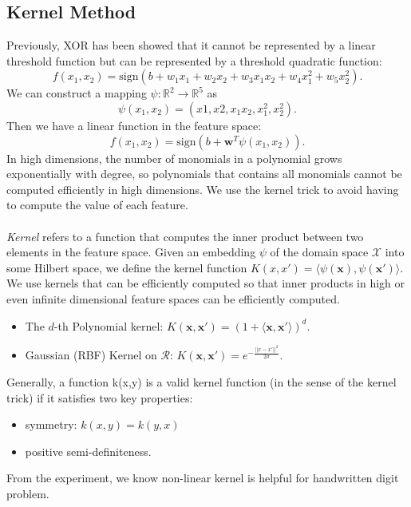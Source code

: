 \documentclass{article}
\begin{document}
   \subsection{Kernel Method}
   Previously, XOR has been showed that it cannot be represented by a linear threshold function but can be represented by a threshold quadratic function:
   \begin{equation}
   f(x_1, x_2) = \text{sign} (b+w_1x_1+w_2x_2+w_3x_1x_2+w_4x_1^2+w_5x_2^2).
   \end{equation}
   We can construct a mapping $\psi : \mathbb{R}^2 \rightarrow \mathbb{R}^5$ as
   \begin{equation}
   \psi (x_1, x_2) = (x1, x2, x_1x_2, x_1^2, x_2^2).
   \end{equation}
   Then we have a linear function in the feature space:
   \begin{equation}
   f(x_1, x_2) = \text{sign} (b+\mathbf{w}^T\psi(x_1, x_2)).
   \end{equation}
   In high dimensions, the number of monomials in a polynomial grows exponentially with degree, so polynomials that contains all monomials cannot be computed efficiently in high dimensions. We use the kernel trick to avoid having to compute the value of each feature. 
   \\\\
   \textit{Kernel} refers to a function that computes the inner product between two elements in the feature space. Given an embedding $\psi$ of the domain space $\mathcal{X}$ into some Hilbert space, we define the kernel function $K(x, x') = \langle \psi(\mathbf{x}), \psi(\mathbf{x}') \rangle$. We use kernels that can be efficiently computed so that inner products in high or even infinite dimensional feature spaces can be efficiently computed.
   \begin{itemize}
   \item The $d$-th Polynomial kernel: $K(\mathbf{x}, \mathbf{x}') = (1+\langle \mathbf{x}, \mathbf{x}' \rangle )^d$.
   \item Gaussian (RBF) Kernel on $\mathcal{R}$: $K(\mathbf{x}, \mathbf{x}') = e^{-\frac{||x-x'||^2}{2\sigma}}$.
   \end{itemize}
   Generally, a function k(x,y) is a valid kernel function (in the sense of the kernel trick) if it satisfies two key properties:
   \begin{itemize}
   \item symmetry: $k(x,y)=k(y,x)$
   \item positive semi-definiteness.
   \end{itemize}
   From the experiment, we know non-linear kernel is helpful for handwritten digit problem.
   
\end{document}
